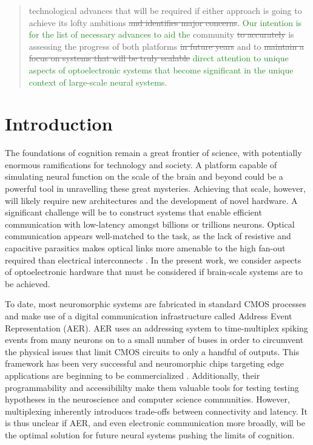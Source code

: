 \documentclass[twocolumn]{article}
\begin{document}
\begin{abstract}
technological advances that will be required if either approach is going to achieve its lofty ambitions \sout{and identifies major concerns}. \textcolor{ForestGreen}{Our intention is for the list of necessary advances to aid the} community \sout{to accurately} is assessing the progress of both platforms \sout{in future years} and to \sout{maintain a focus on systems that will be truly scalable} \textcolor{ForestGreen}{direct attention to unique aspects of optoelectronic systems that become significant in the unique context of large-scale neural systems}. 
\end{abstract}

\setcounter{tocdepth}{4}
\setcounter{secnumdepth}{4}
\tableofcontents

\section{\label{sec:introduction}Introduction}

The foundations of cognition remain a great frontier of science, with potentially enormous ramifications for technology and society. A platform capable of simulating neural function on the scale of the brain and beyond could be a powerful tool in unravelling these great mysteries. Achieving that scale, however, will likely require new architectures and the development of novel hardware. A significant challenge will be to construct systems that enable efficient communication with low-latency amongst billions or trillions neurons. Optical communication appears well-matched to the task, as the lack of resistive and capacitive parasitics makes optical links more amenable to the high fan-out required than electrical interconnects \cite{shainline2018largest}. In the present work, we consider aspects of optoelectronic hardware that must be considered if brain-scale systems are to be achieved. 

To date, most neuromorphic systems are fabricated in standard CMOS processes and make use of a digital communication infrastructure called Address Event Representation (AER). AER uses an addressing system to time-multiplex spiking events from many neurons on to a small number of buses in order to circumvent the physical issues that limit CMOS circuits to only a handful of outputs. This framework has been very successful and neuromorphic chips targeting edge applications are beginning to be commercialized \cite{merolla2014million, davies2018loihi}. Additionally, their programmability and accessibililty make them valuable tools for testing testing hypotheses in the neuroscience and computer science communities. However, multiplexing inherently introduces trade-offs between connectivity and latency. It is thus unclear if AER, and even electronic communication more broadly, will be the optimal solution for future neural systems pushing the limits of cognition.
\end{document}
